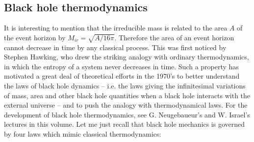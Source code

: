 \documentclass{lamuphys}
\begin{document}
\subsection {Black hole thermodynamics}
\label{sec:luminet:BHTD}

It is interesting to mention that the
irreducible mass is related to the area $A$ of the event horizon by 
$M_{ir} = \sqrt{A/16\pi}$.
Therefore the area of an event horizon cannot decrease
in time by any classical process. This was first noticed by Stephen
Hawking, who drew the striking analogy with ordinary thermodynamics, in which
the entropy of a system never decreases in time. Such a property has motivated a great deal
of theoretical efforts in the
1970's to better understand the laws of black hole dynamics -- i.e. the laws
giving the infinitesimal variations of mass, area and other black hole 
quantities when a black
hole interacts with the external universe -- and to push the analogy with thermodynamical
laws. For the development of black hole thermodynamics, see G. Neugebaueur's and W.
Israel's lectures in this volume. Let me just recall that black hole mechanics is
governed by four laws which mimic classical thermodynamics:
\end{document}
